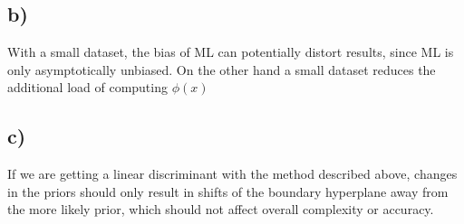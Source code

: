 \documentclass[paper=a4,fontsize=10pt,DIV11,BCOR10mm]{scrartcl}
\begin{document}
	\subsection*{b)}
	With a small dataset, the bias of ML can potentially distort results, since ML is only asymptotically unbiased. On the other hand a small dataset reduces the additional load of computing $\phi(x)$
	
	\subsection*{c)} If we are getting a linear discriminant with the method described above, changes in the priors should only result in shifts of the boundary hyperplane away from the more likely prior, which should not affect overall complexity or accuracy.
	






\end{document}
